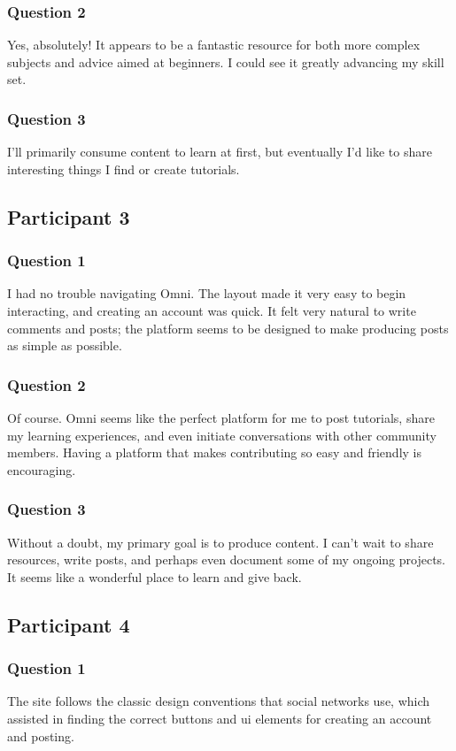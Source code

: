 \subsubsection{Question 2}
Yes, absolutely! It appears to be a fantastic resource for both more complex subjects and advice aimed at beginners. I could see it greatly advancing my skill set.

\subsubsection{Question 3}
I'll primarily consume content to learn at first, but eventually I'd like to share interesting things I find or create tutorials.

\subsection{Participant 3}
\subsubsection{Question 1}
I had no trouble navigating Omni. The layout made it very easy to begin interacting, and creating an account was quick. It felt very natural to write comments and posts; the platform seems to be designed to make producing posts as simple as possible.

\subsubsection{Question 2}
Of course. Omni seems like the perfect platform for me to post tutorials, share my learning experiences, and even initiate conversations with other community members. Having a platform that makes contributing so easy and friendly is encouraging.

\subsubsection{Question 3}
Without a doubt, my primary goal is to produce content. I can't wait to share resources, write posts, and perhaps even document some of my ongoing projects. It seems like a wonderful place to learn and give back.

\subsection{Participant 4}
\subsubsection{Question 1}
The site follows the classic design conventions that social networks use, which assisted in finding the correct buttons and ui elements for creating an account and posting. 

